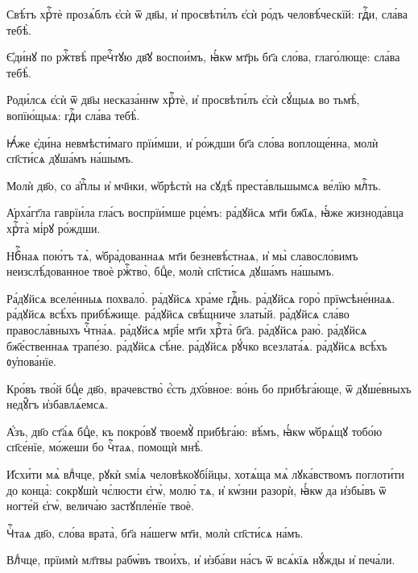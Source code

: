 \hKv Свѣ́тъ хрⷭ҇тѐ прозѧ́блъ є҆сѝ ѿ дв҃ы, и҆ просвѣти́лъ  є҆сѝ ро́дъ человѣ́ческїй: гдⷭ҇и, сла́ва тебѣ̀. 
%

\hKv Є҆ди́нꙋ по ржⷭ҇твѣ̀ пречⷭ҇тꙋю дв҃ꙋ воспои́мъ, ꙗ҆́кѡ мт҃рь  бг҃а сло́ва, глаго́люще: сла́ва тебѣ̀. 
%

\hKv Роди́лсѧ є҆сѝ ѿ дв҃ы несказа́ннѡ хрⷭ҇тѐ, и҆  просвѣти́лъ є҆сѝ сꙋ́щыѧ во тьмѣ̀,  вопїю́щыѧ: гдⷭ҇и сла́ва тебѣ̀. 
%

\hKv Ꙗ҆́же є҆ди́на невмѣсти́маго прїи́мши, и҆ ро́ждши бг҃а  сло́ва воплоще́нна, молѝ сп҃сти́сѧ дꙋша́мъ на́шымъ. 
%

\hKv Молѝ дв҃о, со а҆пⷭ҇лы и҆ мч҃нки, ѡ҆брѣстѝ на сꙋдѣ̀  преста́вльшымсѧ ве́лїю млⷭ҇ть. 
%

\hKv А҆рха́гг҃ла гаврїи́ла гла́съ воспрїи́мше рце́мъ: ра́дꙋйсѧ  мт҃и бж҃їѧ, ꙗ҆́же жизнода́вца хрⷭ҇та̀ мі́рꙋ ро́ждши.  
%

\hKv Нбⷭ҇наѧ пою́тъ тѧ̀, ѡ҆бра́дованнаѧ мт҃и безневѣ́стнаѧ, и҆  мы̀ славосло́вимъ неизслѣ́дованное твоѐ ржⷭ҇тво̀, бцⷣе,  молѝ сп҃сти́сѧ дꙋша́мъ на́шымъ.  
%

\hKv Ра́дꙋйсѧ вселе́нныѧ похвало̀. ра́дꙋйсѧ хра́ме гдⷭ҇нь.  ра́дꙋйсѧ горо̀ прїѡсѣне́ннаѧ. ра́дꙋйсѧ всѣ́хъ прибѣ́жище.  ра́дꙋйсѧ свѣ́щниче златы́й. ра́дꙋйсѧ сла́во правосла́вныхъ  чⷭ҇тна́ѧ. ра́дꙋйсѧ мр҃і́е мт҃и хрⷭ҇та̀ бг҃а. ра́дꙋйсѧ раю̀.  ра́дꙋйсѧ бж҃е́ственнаѧ трапе́зо. ра́дꙋйсѧ сѣ́не. ра́дꙋйсѧ  рꙋ́чко всезлата́ѧ. ра́дꙋйсѧ всѣ́хъ ᲂу҆пова́нїе. 
%

\hKv Кро́въ тво́й бцⷣе дв҃о, врачевство̀ є҆́сть дх҃о́вное:  во́нь бо прибѣга́юще, ѿ дꙋше́вныхъ недꙋ̑гъ и҆збавлѧ́емсѧ. 
%

\hKv А҆́зъ, дв҃о ст҃а́ѧ бцⷣе, къ покро́вꙋ твоемꙋ̀ прибѣга́ю:  вѣ́мъ, ꙗ҆́кѡ ѡ҆брѧ́щꙋ тобо́ю сп҃се́нїе, мо́жеши бо чⷭ҇таѧ,  помощѝ мнѣ̀.  
%

\hKv И҆схи́ти мѧ̀ влⷣчце, рꙋкѝ ѕмі́ѧ человѣкоꙋбі́йцы, хотѧ́ща  мѧ̀ лꙋка́вствомъ поглоти́ти  до  конца̀: сокрꙋшѝ чє́люсти є҆гѡ̀, молю́ тѧ, и҆ кѡ́зни  разорѝ, ꙗ҆́кѡ да и҆збы́въ ѿ ногте́й є҆гѡ̀, велича́ю  застꙋпле́нїе твоѐ. 
%

\hKv Чⷭ҇таѧ дв҃о, сло́ва врата̀, бг҃а на́шегѡ мт҃и, молѝ  сп҃сти́сѧ на́мъ. 
%

\hKv Влⷣчце, прїимѝ мл҃твы рабѡ́въ твои́хъ, и҆ и҆зба́ви на́съ  ѿ всѧ́кїѧ нꙋ́жды и҆ печа́ли.  
